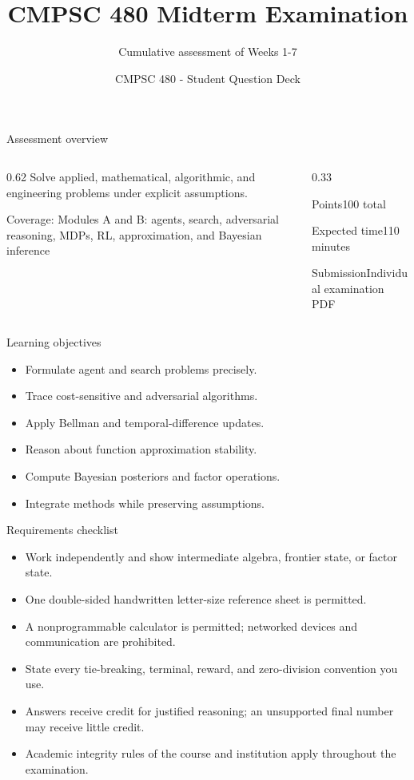 \documentclass[aspectratio=169,11pt]{beamer}
\title[Midterm Questions]{CMPSC 480 Midterm Examination}
\subtitle{Cumulative assessment of Weeks 1-7}
\author{CMPSC 480 - Student Question Deck}
\date{}
\begin{document}
\begin{frame}
  \titlepage
\end{frame}

\begin{frame}{Assessment overview}
\begin{columns}[T,onlytextwidth]
\begin{column}{0.62\textwidth}
\Large Solve applied, mathematical, algorithmic, and engineering problems under explicit assumptions.

\vspace{0.35cm}
\normalsize
Coverage: Modules A and B: agents, search, adversarial reasoning, MDPs, RL, approximation, and Bayesian inference
\end{column}
\begin{column}{0.33\textwidth}
\begin{block}{Points}100 total\end{block}
\begin{block}{Expected time}110 minutes\end{block}
\begin{block}{Submission}Individual examination PDF\end{block}
\end{column}
\end{columns}
\end{frame}

\begin{frame}{Learning objectives}
\begin{itemize}
  \item Formulate agent and search problems precisely.
  \item Trace cost-sensitive and adversarial algorithms.
  \item Apply Bellman and temporal-difference updates.
  \item Reason about function approximation stability.
  \item Compute Bayesian posteriors and factor operations.
  \item Integrate methods while preserving assumptions.
\end{itemize}
\end{frame}

\begin{frame}{Requirements checklist}
\small
\begin{itemize}
  \item Work independently and show intermediate algebra, frontier state, or factor state.
  \item One double-sided handwritten letter-size reference sheet is permitted.
  \item A nonprogrammable calculator is permitted; networked devices and communication are prohibited.
  \item State every tie-breaking, terminal, reward, and zero-division convention you use.
  \item Answers receive credit for justified reasoning; an unsupported final number may receive little credit.
  \item Academic integrity rules of the course and institution apply throughout the examination.
\end{itemize}
\end{frame}
\end{document}
